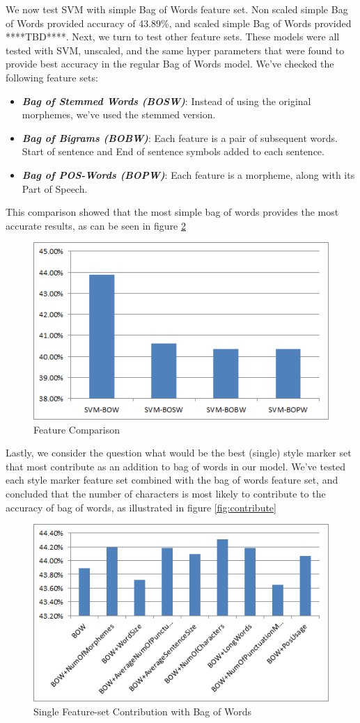 \documentclass[a4paper]{article}
\begin{document}
We now test SVM with simple Bag of Words feature set.
Non scaled simple Bag of Words provided accuracy of 43.89\%, and scaled simple Bag of Words provided ****TBD****.
Next, we turn to test other feature sets. These models were all tested with SVM, unscaled, and the same hyper parameters that were found to provide best accuracy in the regular Bag of Words model. We've checked the following feature sets:
\begin{itemize}
\item \textbf{\emph{Bag of Stemmed Words (BOSW)}}: Instead of using the original morphemes, we've used the stemmed version.
\item \textbf{\emph{Bag of Bigrams (BOBW)}}: Each feature is a pair of subsequent words. Start of sentence and End of sentence symbols added to each sentence.
\item \textbf{\emph{Bag of POS-Words (BOPW)}}: Each feature is a morpheme, along with its Part of Speech.
\end{itemize}
This comparison showed that the most simple bag of words provides the most accurate results, as can be seen in figure \ref{fig:feature comparison}
\begin{figure}[!h]
	\centering
	\includegraphics[width=.5\textwidth]{"figures/feature_comparison"}
	\caption{Feature Comparison}
	\label{fig:feature comparison}
\end{figure}
Lastly, we consider the question what would be the best (single) style marker set that most contribute as an addition to bag of words in our model.
We've tested each style marker feature set combined with the bag of words feature set, and concluded that the number of characters is most likely to contribute to the accuracy of bag of words, as illustrated in figure \ref{fig:contribute}
\begin{figure}[!h]
	\centering
	\includegraphics[width=.5\textwidth]{"figures/contribute"}
	\caption{Single Feature-set Contribution with Bag of Words}
	\label{fig:feature comparison}
\end{figure}
\end{document}
